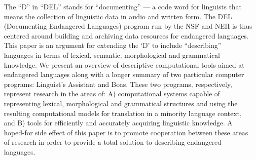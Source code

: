 The ``D'' in ``DEL'' stands for ``documenting'' --- a code word for linguists that means the collection of linguistic data in audio and written form. The DEL (Documenting Endangered Languages) program run by the NSF and NEH is thus centered around building and archiving data resources for endangered languages. This paper is an argument for extending the ‘D' to include ``describing'' languages in terms of lexical, semantic, morphological and grammatical knowledge. We present an overview of descriptive computational tools aimed at endangered languages along with a longer summary of two particular computer programs: Linguist's Assistant and Boas. These two programs, respectively, represent research in the areas of: A) computational systems capable of representing lexical, morphological and grammatical structures and using the resulting computational models for translation in a minority language context, and B) tools for efficiently and accurately acquiring linguistic knowledge. A hoped-for side effect of this paper is to promote cooperation between these areas of research in order to provide a total solution to describing endangered languages.
